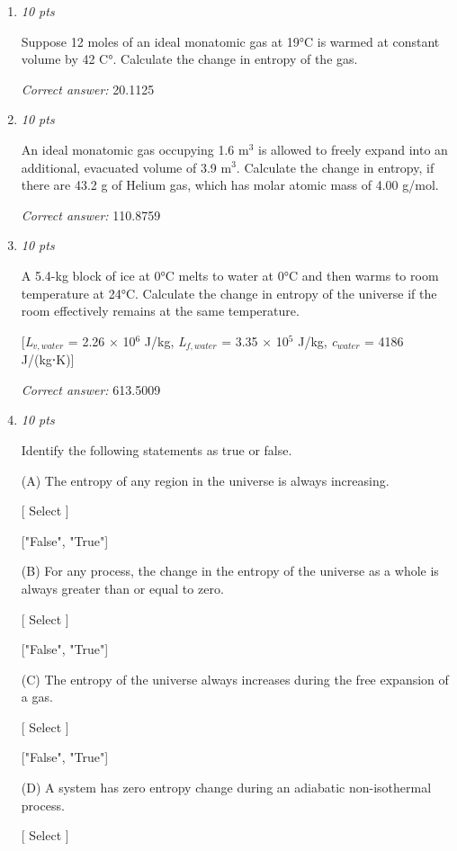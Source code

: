 \documentclass[11pt]{article}
\begin{document}
\begin{enumerate}[leftmargin=*,label=\textbf{Question \arabic*.}]
\textit{Correct answer:} 418.5395

\item \hfill \textit{10 pts}

Suppose 12 moles of an ideal monatomic gas at 19°C is warmed at constant volume by 42 C°. Calculate the change in entropy of the gas.

\textit{Correct answer:} 20.1125

\item \hfill \textit{10 pts}

An ideal  monatomic gas occupying 1.6 m$^{3}$ is allowed to freely expand into an additional, evacuated volume of 3.9 m$^{3}$. Calculate the change in entropy, if there are 43.2 g of Helium gas, which has molar atomic mass of 4.00 g/mol.

\textit{Correct answer:} 110.8759

\item \hfill \textit{10 pts}

A 5.4-kg block of ice at 0°C melts to water at 0°C and then warms to room temperature at 24°C. Calculate the change in entropy of the universe if the room effectively remains at the same temperature.

[\emph{L}$_{v,water}$ = 2.26 × 10$^{6}$ J/kg, \emph{L}$_{f,water}$ = 3.35 × 10$^{5}$ J/kg, \emph{c}$_{water}$ = 4186 J/(kg⋅K)]

\textit{Correct answer:} 613.5009

\item \hfill \textit{10 pts}

Identify the following statements as true or false.

(A) The entropy of any region in the universe is always increasing.

    [ Select ]

  ["False", "True"]

(B) For any process, the change in the entropy of the universe as a whole is always greater than or equal to zero.

    [ Select ]

  ["False", "True"]

(C) The entropy of the universe always increases during the free expansion of a gas.

    [ Select ]

  ["False", "True"]

(D) A system has zero entropy change during an adiabatic non-isothermal process.

    [ Select ]


\end{enumerate}
\end{document}
